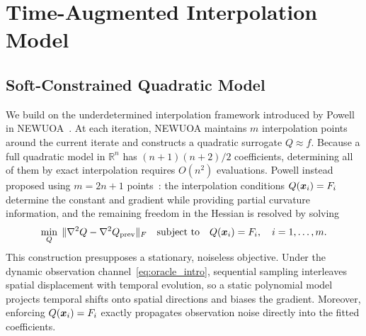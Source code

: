 \section{Time-Augmented Interpolation Model}
\label{sec:augmented-model}

\subsection{Soft-Constrained Quadratic Model}
\label{sec:kkt-derivation}

We build on the underdetermined interpolation framework introduced by Powell in NEWUOA~\cite{Powell2006NEWUOA}. At each iteration, NEWUOA maintains $m$ interpolation points around the current iterate and constructs a quadratic surrogate $Q \approx f$. Because a full quadratic model in $\mathbb{R}^n$ has $(n+1)(n+2)/2$ coefficients, determining all of them by exact interpolation requires $O(n^2)$ evaluations. Powell instead proposed using $m = 2n+1$ points~\cite{Powell2004LeastFrobenius}: the interpolation conditions $Q(\boldsymbol{x}_i) = F_i$ determine the constant and gradient while providing partial curvature information, and the remaining freedom in the Hessian is resolved by solving
\[
  \min_{Q}\; \|\nabla^2 Q - \nabla^2 Q_{\mathrm{prev}}\|_F
  \quad \text{subject to} \quad Q(\boldsymbol{x}_i) = F_i, \quad i = 1, \dots, m.
\]
This construction presupposes a stationary, noiseless objective. Under the dynamic observation channel~\eqref{eq:oracle_intro}, sequential sampling interleaves spatial displacement with temporal evolution, so a static polynomial model projects temporal shifts onto spatial directions and biases the gradient. Moreover, enforcing $Q(\boldsymbol{x}_i) = F_i$ exactly propagates observation noise directly into the fitted coefficients.

